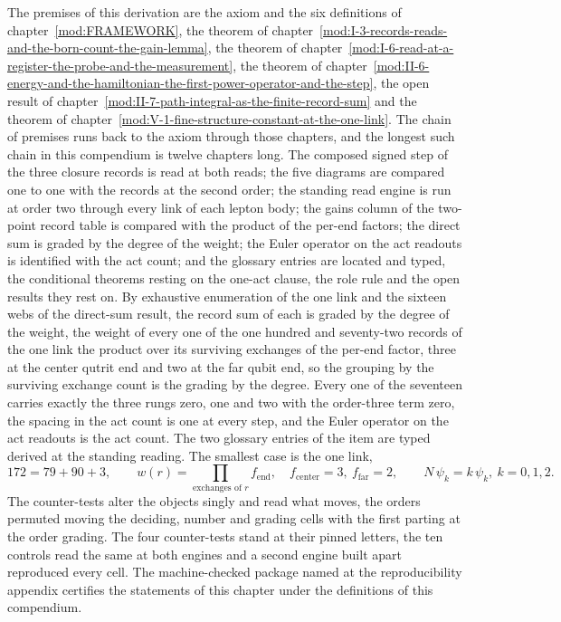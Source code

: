 \begin{chproof}[census]
The premises of this derivation are the axiom and the six definitions of chapter~\ref{mod:FRAMEWORK}, the theorem of chapter~\ref{mod:I-3-records-reads-and-the-born-count-the-gain-lemma}, the theorem of chapter~\ref{mod:I-6-read-at-a-register-the-probe-and-the-measurement}, the theorem of chapter~\ref{mod:II-6-energy-and-the-hamiltonian-the-first-power-operator-and-the-step}, the open result of chapter~\ref{mod:II-7-path-integral-as-the-finite-record-sum} and the theorem of chapter~\ref{mod:V-1-fine-structure-constant-at-the-one-link}. The chain of premises runs back to the axiom through those chapters, and the longest such chain in this compendium is twelve chapters long.
The composed signed step of the three closure records is read at both reads; the five diagrams are compared one to one with the records at the second order; the standing read engine is run at order two through every link of each lepton body; the gains column of the two-point record table is compared with the product of the per-end factors; the direct sum is graded by the degree of the weight; the Euler operator on the act readouts is identified with the act count; and the glossary entries are located and typed, the conditional theorems resting on the one-act clause, the role rule and the open results they rest on.
By exhaustive enumeration of the one link and the sixteen webs of the direct-sum result, the record sum of each is graded by the degree of the weight, the weight of every one of the one hundred and seventy-two records of the one link the product over its surviving exchanges of the per-end factor, three at the center qutrit end and two at the far qubit end, so the grouping by the surviving exchange count is the grading by the degree. Every one of the seventeen carries exactly the three rungs zero, one and two with the order-three term zero, the spacing in the act count is one at every step, and the Euler operator on the act readouts is the act count. The two glossary entries of the item are typed derived at the standing reading. The smallest case is the one link,
\begin{equation} 172 = 79 + 90 + 3, \qquad w(r) = \prod_{\text{exchanges of } r} f_{\mathrm{end}}, \quad f_{\mathrm{center}} = 3,\ f_{\mathrm{far}} = 2, \qquad N\,\psi_{k} = k\,\psi_{k},\ k = 0, 1, 2 . \end{equation}
The counter-tests alter the objects singly and read what moves, the orders permuted moving the deciding, number and grading cells with the first parting at the order grading. The four counter-tests stand at their pinned letters, the ten controls read the same at both engines and a second engine built apart reproduced every cell.
The machine-checked package named at the reproducibility appendix certifies the statements of this chapter under the definitions of this compendium.
\end{chproof}
\par\medskip{}\label{narr:close:5-6}\par
